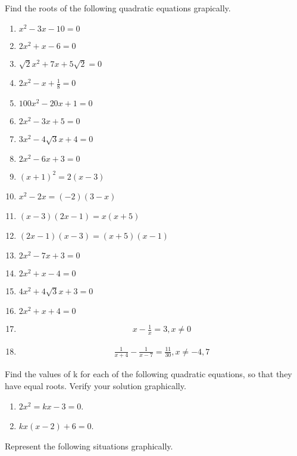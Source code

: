 Find the roots of the following quadratic  equations grapically.
\begin{enumerate}[label=\thesubsection.\arabic*,ref=\thesubsection.\theenumi]
\item $x^2-3x-10=0$
\item $2x^2+x-6=0$
\item $ \sqrt 2x^2+7x+5 \sqrt 2=0$
\item $2x^2-x+\frac{1}{8}=0$
\item $100x^2-20x+1=0$
\item $2x^2-3x+5=0$
\item $3x^2-4 \sqrt 3x+4=0$
\item $2x^2-6x+3=0$
\item $(x+1)^2=2(x-3)$
\item $x^2-2x=(-2)(3-x)$
\item $(x-3)(2x-1)=x(x+5)$
\item $(2x-1)(x-3)=(x+5)(x-1)$
\item
$2x^2-7x+3=0$
\item
$2x^2+x-4=0$
\item
$4x^2+4\sqrt 3x+3=0$
\item
$2x^2+x+4=0$
\item
\begin{align}
x-\frac{1}{x}=3, x\neq{0}
\end{align}
\item
\begin{align}
\frac{1}{x+4}-\frac{1}{x-7}=\frac{11}{30}, x\neq{-4,7}
\end{align}
\end{enumerate}
Find the values of k for each of the following quadratic equations, so that they have equal roots.  Verify your solution graphically.
\begin{enumerate}[label=\thesubsection.\arabic*,ref=\thesubsection.\theenumi,resume*]
\item $2x^2=kx-3=0$.
\item $kx(x-2)+6=0$.
\end{enumerate}
Represent the following situations graphically.
